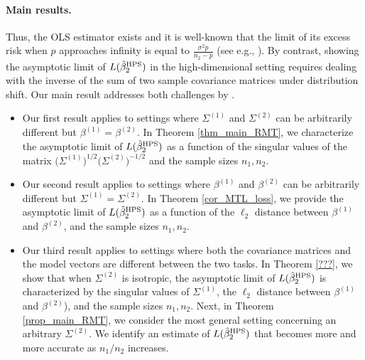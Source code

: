 \paragraph{Main results.} 
Thus, the OLS estimator exists and it is well-known that the limit of its excess risk when $p$ approaches infinity is equal to $\frac{\sigma^2 p}{n_2 - p}$ (see e.g., \citet{bai2009spectral}).
By contrast, showing the asymptotic limit of $L(\hat{\beta}^{\textup{HPS}}_2)$ in the high-dimensional setting requires dealing with the inverse of the sum of two sample covariance matrices under distribution shift.
Our main result addresses both challenges by .
\begin{itemize}
    \item %
    Our first result applies to settings where $\Sigma^{(1)}$ and $\Sigma^{(2)}$ can be arbitrarily different but $\beta^{(1)} = \beta^{(2)}$.
    In Theorem \ref{thm_main_RMT}, we characterize the asymptotic limit of $L(\hat{\beta}_2^{\textup{HPS}})$ as a function of the singular values of the matrix $\big(\Sigma^{(1)}\big)^{1/2}\big(\Sigma^{(2)}\big)^{-1/2}$ and the sample sizes $n_1, n_2$.
    \item %
    Our second result applies to settings where $\beta^{(1)}$ and $\beta^{(2)}$ can be arbitrarily different but $\Sigma^{(1)} = \Sigma^{(2)}$.
    In Theorem \ref{cor_MTL_loss}, we provide the asymptotic limit of $L(\hat{\beta}_2^{\textup{HPS}})$ as a function of the $\ell_2$ distance between $\beta^{(1)}$ and $\beta^{(2)}$, and the sample sizes $n_1, n_2$.
    \item %
    Our third result applies to settings where both the covariance matrices and the model vectors are different between the two tasks.
    In Theorem \ref{???}, we show that when $\Sigma^{(2)}$ is isotropic, the asymptotic limit of $L(\hat{\beta}_2^{\textup{HPS}})$ is characterized by the singular values of $\Sigma^{(1)}$, the $\ell_2$ distance between $\beta^{(1)}$ and $\beta^{(2)}$), and the sample sizes $n_1, n_2$.
    Next, in Theorem \ref{prop_main_RMT}, we consider the most general setting concerning an arbitrary $\Sigma^{(2)}$. We identify an estimate of $L(\hat{\beta}_2^{\textup{HPS}})$ that becomes more and more accurate as $n_1 / n_2$ increases.
\end{itemize}

